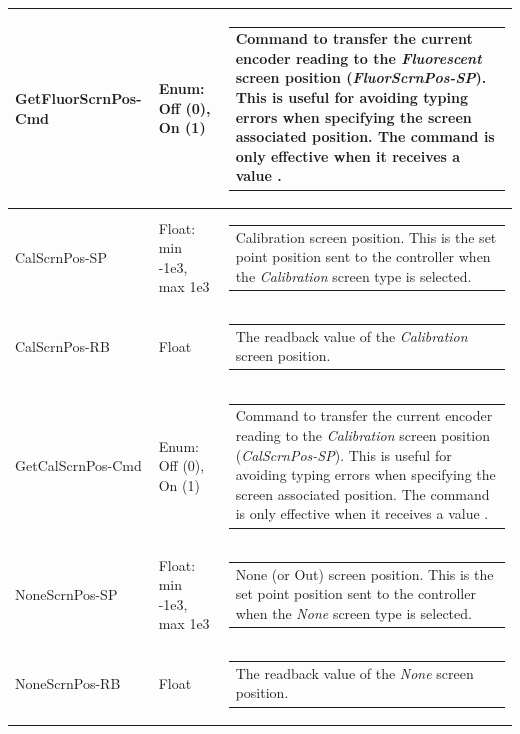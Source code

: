 \documentclass[openany]{article}
\begin{document}
\begin{longtable}{| m{4.5cm} m{2.5cm}  m{7.0cm} |}
        GetFluorScrnPos-Cmd & Enum: Off (0), On (1) & \begin{tabular}{@{}m{6cm}@{}}
                Command to transfer the current encoder reading to the \emph{Fluorescent} screen position (\emph{FluorScrnPos-SP}). This is useful for avoiding typing errors when specifying the screen associated position. The command is only effective when it receives a value $\neq 0$.
            \end{tabular} \hypertarget{pv:cal-scrn-pos}{}\\ \hline
        CalScrnPos-SP & Float: min -1e3, max 1e3 & \begin{tabular}{@{}m{6cm}@{}}
                Calibration screen position. This is the set point position sent to the controller when the \emph{Calibration} screen type is selected.
            \end{tabular} \hypertarget{}{}\\ \hline
        CalScrnPos-RB & Float & \begin{tabular}{@{}m{6cm}@{}}
                The readback value of the \emph{Calibration} screen position.
            \end{tabular} \hypertarget{pv:get-cal-scrn-pos-cmd}{}\\ \hline
        GetCalScrnPos-Cmd & Enum: Off (0), On (1) & \begin{tabular}{@{}m{6cm}@{}}
                Command to transfer the current encoder reading to the \emph{Calibration} screen position (\emph{CalScrnPos-SP}). This is useful for avoiding typing errors when specifying the screen associated position. The command is only effective when it receives a value $\neq 0$.
            \end{tabular} \hypertarget{pv:none-scrn-pos}{}\\ \hline
        NoneScrnPos-SP & Float: min -1e3, max 1e3 & \begin{tabular}{@{}m{6cm}@{}}
                None (or Out) screen position. This is the set point position sent to the controller when the \emph{None} screen type is selected.
            \end{tabular} \hypertarget{}{}\\ \hline
        NoneScrnPos-RB & Float & \begin{tabular}{@{}m{6cm}@{}}
                The readback value of the \emph{None} screen position.
            \end{tabular} \hypertarget{pv:get-none-scrn-pos-cmd}{}\\ \hline

\end{longtable}
\end{document}
